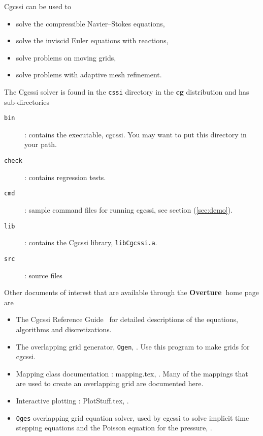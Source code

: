 \documentclass{article}
\newcommand{\Overture}{{\bf Overture\ }}
\begin{document}
Cgcssi can be used to 
\begin{itemize}
  \item solve the compressible Navier--Stokes equations,
  \item solve the inviscid Euler equations with reactions, 
  \item solve problems on moving grids, 
  \item solve problems with adaptive mesh refinement.
\end{itemize} 

The Cgcssi solver is found in the {\tt cssi} directory in the {\bf cg} distribution and has
sub-directories
\begin{description}
 \item[{\tt bin}] : contains the executable, cgcssi. You may want to put this directory in your path.
 \item[{\tt check}] : contains regression tests.
 \item[{\tt cmd}] : sample command files for running cgcssi, see section (\ref{sec:demo}).
 \item[{\tt lib}] : contains the Cgcssi library, {\tt libCgcssi.a}.
 \item[{\tt src}] : source files 
\end{description}


\noindent
Other documents of interest that are available through the \Overture home page are
\begin{itemize}
\item The Cgcssi Reference Guide~\cite{CgcssiReferenceManual} for detailed descriptions of the
      equations, algorithms and discretizations.
\item The overlapping grid generator, {\tt Ogen}, \cite{OGEN}. Use this program to make grids for cgcssi.
\item Mapping class documentation : {\ff mapping.tex}, \cite{MAPPINGS}. Many of the mappings that
   are used to create an overlapping grid are documented here. 
\item Interactive plotting : {\ff PlotStuff.tex}, \cite{PLOTSTUFF}.
\item {\tt Oges} overlapping grid equation solver, used by cgcssi to solve implicit time stepping
    equations and the Poisson equation for the pressure, \cite{OGES}.
\end{itemize}
\end{document}
